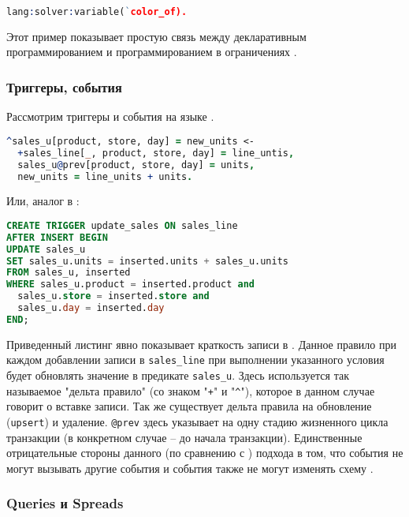 \begin{lstlisting}[language=Prolog]
lang:solver:variable(`color_of).
\end{lstlisting}

Этот пример показывает простую связь между декларативным программированием и программированием в ограничениях \cite{logiql_vs_datalog}.

\subsubsection{Триггеры, события}
\label{sec:technology:logiql:triggers_events}

Рассмотрим триггеры и события на языке \logiql.

\begin{lstlisting}[language=Prolog]
^sales_u[product, store, day] = new_units <-
  +sales_line[_, product, store, day] = line_untis,
  sales_u@prev[product, store, day] = units,
  new_units = line_units + units.
\end{lstlisting}

Или, аналог в \sql:

\begin{lstlisting}[language=SQL]
CREATE TRIGGER update_sales ON sales_line
AFTER INSERT BEGIN
UPDATE sales_u
SET sales_u.units = inserted.units + sales_u.units
FROM sales_u, inserted
WHERE sales_u.product = inserted.product and
  sales_u.store = inserted.store and
  sales_u.day = inserted.day
END;
\end{lstlisting}

Приведенный листинг явно показывает краткость записи в \logiql. Данное правило при каждом добавлении записи в \lstinline{sales_line} при выполнении указанного условия будет обновлять значение в предикате \lstinline{sales_u}. Здесь используется так называемое "дельта правило" (со знаком "\lstinline{+}" и "\lstinline{^}"), которое в данном случае говорит о вставке записи. Так же существует дельта правила на обновление (\lstinline{upsert}) и удаление. \lstinline{@prev} здесь указывает на одну стадию жизненного цикла транзакции (в конкретном случае – до начала транзакции).
Единственные отрицательные стороны данного (по сравнению с \sql) подхода в том, что события не могут вызывать другие события и события также не могут изменять схему \cite{query_language_for_smart_db}.

\subsubsection{Queries и Spreads}
\label{sec:technology:logiql:queries_spreads}

